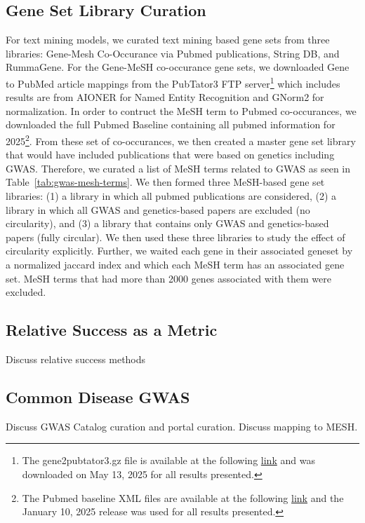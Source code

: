 \subsection{Gene Set Library Curation}
For text mining models, we curated text mining based gene sets from three libraries: Gene-Mesh Co-Occurance via Pubmed publications, String DB, and RummaGene. For the Gene-MeSH co-occurance gene sets, we downloaded Gene to PubMed article mappings from the PubTator3 \cite{wei_pubtator_2024} FTP server\footnote{The gene2pubtator3.gz file is available at the following \href{https://ftp.ncbi.nlm.nih.gov/pub/lu/PubTator3/}{link} and was downloaded on May 13, 2025 for all results presented.} which includes results are from AIONER \cite{luo_aioner_2023} for Named Entity Recognition and GNorm2 \cite{wei_gnorm2_2023} for normalization. In order to contruct the MeSH term to Pubmed co-occurances, we downloaded the full Pubmed Baseline containing all pubmed information for 2025\footnote{The Pubmed baseline XML files are available at the following \href{https://ftp.ncbi.nlm.nih.gov/pubmed/baseline/}{link} and the January 10, 2025 release was used for all results presented.}. From these set of co-occurances, we then created a master gene set library that would have included publications that were based on genetics including GWAS. Therefore, we curated a list of MeSH terms related to GWAS as seen in Table~\ref{tab:gwas-mesh-terms}. We then formed three MeSH-based gene set libraries: (1) a library in which all pubmed publications are considered, (2) a library in which all GWAS and genetics-based papers are excluded (no circularity), and (3) a library that contains only GWAS and genetics-based papers (fully circular). We then used these three libraries to study the effect of circularity explicitly. Further, we waited each gene in their associated geneset by a normalized jaccard index and which each MeSH term has an associated gene set. MeSH terms that had more than 2000 genes associated with them were excluded.



\subsection{Relative Success as a Metric}
Discuss relative success methods

\subsection{Common Disease GWAS}
Discuss GWAS Catalog curation and portal curation. Discuss mapping to MESH.

